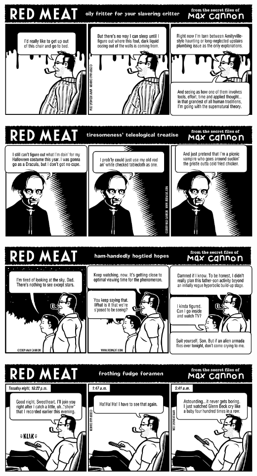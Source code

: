 \documentclass[a4paper,twoside,11pt]{article}
\begin{document}
\includegraphics[width=\textwidth]{redmeat_2009-10-20.png}



\includegraphics[width=\textwidth]{redmeat_2009-10-27.png}



\includegraphics[width=\textwidth]{redmeat_2009-11-03.png}



\includegraphics[width=\textwidth]{redmeat_2009-11-10.png}
\end{document}
